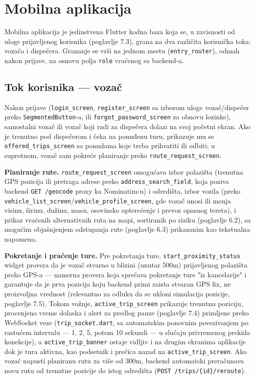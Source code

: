\chapter{Mobilna aplikacija}

Mobilna aplikacija je jedinstvena Flutter kodna baza koja se, u zavisnosti od uloge prijavljenog korisnika (poglavlje 7.3), grana na dva različita korisnička toka: vozača i dispečera. Grananje se vrši na jednom mestu (\texttt{entry\_router}), odmah nakon prijave, na osnovu polja \texttt{role} vraćenog sa backend-a.

\section{Tok korisnika — vozač}

Nakon prijave (\texttt{login\_screen}, \texttt{register\_screen} sa izborom uloge vozač/dispečer preko \texttt{SegmentedButton}-a, ili \texttt{forgot\_password\_screen} za obnovu lozinke), samostalni vozač ili vozač koji radi za dispečera dolazi na svoj početni ekran. Ako je trenutno pod dispečerom i čeka na ponuđenu turu, prikazuje mu se \texttt{offered\_trips\_screen} sa ponudama koje treba prihvatiti ili odbiti; u suprotnom, vozač sam pokreće planiranje preko \texttt{route\_request\_screen}.

\textbf{Planiranje rute.} \texttt{route\_request\_screen} omogućava izbor polazišta (trenutna GPS pozicija ili pretraga adrese preko \texttt{address\_search\_field}, koja poziva backend \texttt{GET /geocode} proxy ka Nominatim-u) i odredišta, izbor vozila (preko \texttt{vehicle\_list\_screen}/\texttt{vehicle\_profile\_screen}, gde vozač unosi ili menja visinu, širinu, dužinu, masu, osovinsko opterećenje i prevoz opasnog tereta), i prikaz vraćenih alternativnih ruta na mapi, sortiranih po riziku (poglavlje 6.2), sa mogućim objašnjenjem odstupanja rute (poglavlje 6.3) prikazanim kao tekstualna napomena.

\textbf{Pokretanje i praćenje ture.} Pre pokretanja ture, \texttt{start\_proximity\_status} widget provera da je vozač stvarno u blizini (unutar 500m) prijavljenog polazišta preko GPS-a — namerna provera koja sprečava pokretanje ture "iz kancelarije" i garantuje da je prva pozicija koju backend primi zaista stvaran GPS fix, ne proizvoljna vrednost (relevantno za odluku da se ukloni simulacija pozicije, poglavlje 7.5). Tokom vožnje, \texttt{active\_trip\_screen} prikazuje trenutnu poziciju, procenjeno vreme dolaska i alert za predlog pauze (poglavlje 7.4) primljene preko WebSocket veze (\texttt{trip\_socket.dart}, sa automatskim ponovnim povezivanjem po rastućem intervalu — 1, 2, 5, potom 10 sekundi — u slučaju privremenog prekida konekcije), a \texttt{active\_trip\_banner} ostaje vidljiv i na drugim ekranima aplikacije dok je tura aktivna, kao podsetnik i prečica nazad na \texttt{active\_trip\_screen}. Ako vozač napusti planiranu rutu za više od 300m, backend automatski preračunava novu rutu od trenutne pozicije do istog odredišta (\texttt{POST /trips/\{id\}/reroute}).


